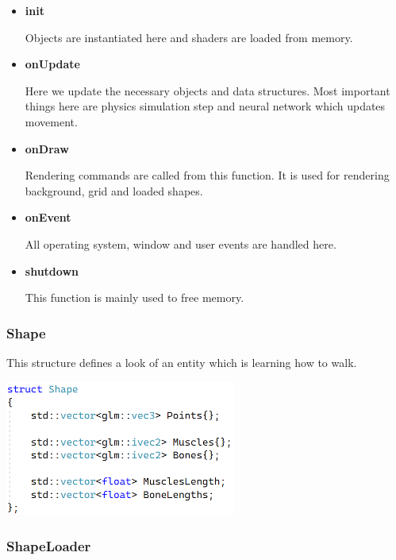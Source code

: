         \begin{itemize}
        
            \item \textbf{init}

            Objects are instantiated here and shaders are loaded from memory.

            \item \textbf{onUpdate}

            Here we update the necessary objects and data structures. Most important things here are physics simulation step and neural network which updates movement.

            \item \textbf{onDraw}

            Rendering commands are called from this function. It is used for rendering background, grid and loaded shapes.

            \item \textbf{onEvent}

            All operating system, window and user events are handled here.

            \item \textbf{shutdown}

            This function is mainly used to free memory.
            
        \end{itemize}

    \hfill
    
    \subsubsection{\textbf{\large Shape}}

        This structure defines a look of an entity which is learning how to walk.

        \includegraphics[width=3in]{resources/Shape.png}

    \hfill

    \subsubsection{\textbf{\large ShapeLoader}}

